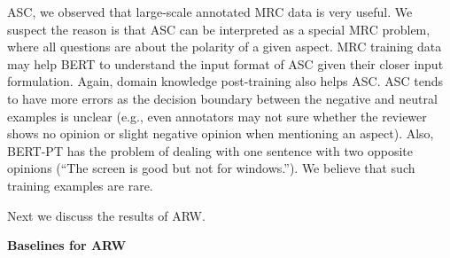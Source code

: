 ASC, we observed that large-scale annotated MRC data is very useful.
We suspect the reason is that ASC can be interpreted as a special MRC problem, where all questions are about the polarity of a given aspect.
MRC training data may help BERT to understand the input format of ASC given their closer input formulation.
Again, domain knowledge post-training also helps ASC.
ASC tends to have more errors as the decision boundary between the negative and neutral examples is unclear (e.g., even annotators may not sure whether the reviewer shows no opinion or slight negative opinion when mentioning an aspect).
Also, BERT-PT has the problem of dealing with one sentence with two opposite opinions (``The screen is good but not for windows.''). We believe that such training examples are rare.

Next we discuss the results of ARW.

\textbf{Baselines for ARW}
\label{chap6:sec:baselines}

